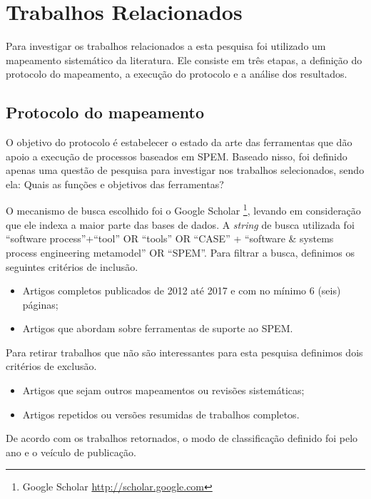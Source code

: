 \section{Trabalhos Relacionados}\label{sec:trabalhosRelacionados}
Para investigar os trabalhos relacionados a esta pesquisa foi utilizado um mapeamento sistemático da literatura. Ele consiste em três etapas, a definição do protocolo do mapeamento, a execução do protocolo e a análise dos resultados.


\subsection{Protocolo do mapeamento}\label{sub:trabalhosRelacionados_metodologia}
O objetivo do protocolo é estabelecer o estado da arte das ferramentas que dão apoio a execução de processos baseados em SPEM. Baseado nisso, foi definido apenas uma questão de pesquisa para investigar nos trabalhos selecionados, sendo ela: Quais as funções e objetivos das ferramentas?

O mecanismo de busca escolhido foi o Google Scholar \footnote{Google Scholar \url{http://scholar.google.com}}, levando em consideração que ele indexa a maior parte das bases de dados. A \textit{string} de busca utilizada foi ``software process''+``tool'' OR ``tools'' OR ``CASE'' + ``software \& systems process engineering metamodel'' OR ``SPEM''. Para filtrar a busca, definimos os seguintes critérios de inclusão.

\begin{itemize}
	\item Artigos completos publicados de 2012 até 2017 e com no mínimo 6 (seis) páginas;
	\item Artigos que abordam sobre ferramentas de suporte ao SPEM.
\end{itemize}

Para retirar trabalhos que não são interessantes para esta pesquisa definimos dois critérios de exclusão.
\begin{itemize}
	\item Artigos que sejam outros mapeamentos ou revisões sistemáticas;
	\item Artigos repetidos ou versões resumidas de trabalhos completos.
\end{itemize}
De acordo com os trabalhos retornados, o modo de classificação definido foi pelo ano e o veículo de publicação.

